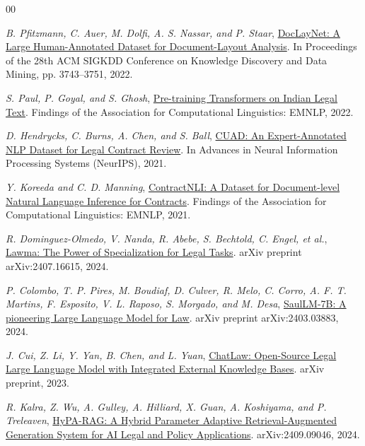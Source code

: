 \documentclass[3p,times,procedia]{elsarticle}
\begin{document}
\begin{thebibliography}{00}

\textit{B. Pfitzmann, C. Auer, M. Dolfi, A. S. Nassar, and P. Staar},
\href{https://doi.org/10.1145/3534678.3539043}{DocLayNet: A Large Human-Annotated Dataset for Document-Layout Analysis}. In Proceedings of the 28th ACM SIGKDD Conference on Knowledge Discovery and Data Mining, pp. 3743--3751, 2022.

\textit{S. Paul, P. Goyal, and S. Ghosh},
\href{https://www.researchgate.net/publication/363536999_Pre-training_Transformers_on_Indian_Legal_Text}{Pre-training Transformers on Indian Legal Text}. Findings of the Association for Computational Linguistics: EMNLP, 2022.

\textit{D. Hendrycks, C. Burns, A. Chen, and S. Ball},
\href{https://datasets-benchmarks-proceedings.neurips.cc/paper_files/paper/2021/hash/6ea9ab1baa0efb9e19094440c317e21b-Abstract-round1.html}{CUAD: An Expert-Annotated NLP Dataset for Legal Contract Review}. In Advances in Neural Information Processing Systems (NeurIPS), 2021.

\textit{Y. Koreeda and C. D. Manning},
\href{https://aclanthology.org/2021.findings-emnlp.164/}{ContractNLI: A Dataset for Document-level Natural Language Inference for Contracts}. Findings of the Association for Computational Linguistics: EMNLP, 2021.

\textit{R. Dominguez-Olmedo, V. Nanda, R. Abebe, S. Bechtold, C. Engel, et al.},
\href{https://arxiv.org/abs/2407.16615}{Lawma: The Power of Specialization for Legal Tasks}. arXiv preprint arXiv:2407.16615, 2024.

\textit{P. Colombo, T. P. Pires, M. Boudiaf, D. Culver, R. Melo, C. Corro, A. F. T. Martins, F. Esposito, V. L. Raposo, S. Morgado, and M. Desa},
\href{https://arxiv.org/abs/2403.03883}{SaulLM-7B: A pioneering Large Language Model for Law}. arXiv preprint arXiv:2403.03883, 2024.

\textit{J. Cui, Z. Li, Y. Yan, B. Chen, and L. Yuan},
\href{https://www.researchgate.net/publication/371943604_ChatLaw_Open-Source_Legal_Large_Language_Model_with_Integrated_External_Knowledge_Bases}{ChatLaw: Open-Source Legal Large Language Model with Integrated External Knowledge Bases}. arXiv preprint, 2023.

\textit{R. Kalra, Z. Wu, A. Gulley, A. Hilliard, X. Guan, A. Koshiyama, and P. Treleaven},
\href{https://doi.org/10.48550/arxiv.2409.09046}{HyPA-RAG: A Hybrid Parameter Adaptive Retrieval-Augmented Generation System for AI Legal and Policy Applications}. arXiv:2409.09046, 2024.


\end{thebibliography}
\end{document}
